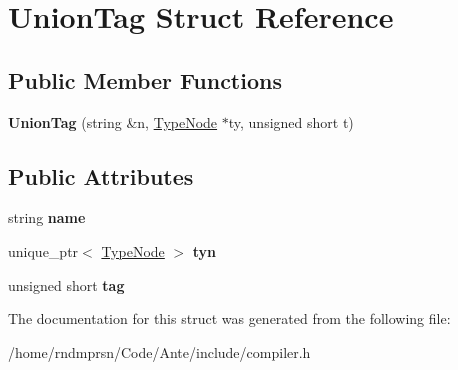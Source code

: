 \hypertarget{structUnionTag}{}\section{Union\+Tag Struct Reference}
\label{structUnionTag}
\subsection*{Public Member Functions}
\begin{DoxyCompactItemize}
\item 
\mbox{\label{structUnionTag_aa739cecbbf668141b88c4ff8b6cfbc5b}} 
{\bfseries Union\+Tag} (string \&n, \hyperlink{structTypeNode}{Type\+Node} $\ast$ty, unsigned short t)
\end{DoxyCompactItemize}
\subsection*{Public Attributes}
\begin{DoxyCompactItemize}
\item 
\mbox{\label{structUnionTag_ab73e6ebdee667537a693b22cf6a848b1}} 
string {\bfseries name}
\item 
\mbox{\label{structUnionTag_a020bb39f5d96eedecf5672efcefe8326}} 
unique\+\_\+ptr$<$ \hyperlink{structTypeNode}{Type\+Node} $>$ {\bfseries tyn}
\item 
\mbox{\label{structUnionTag_a681198408c54d2a565a5d3c4721d0280}} 
unsigned short {\bfseries tag}
\end{DoxyCompactItemize}


The documentation for this struct was generated from the following file\+:\begin{DoxyCompactItemize}
\item 
/home/rndmprsn/\+Code/\+Ante/include/compiler.\+h\end{DoxyCompactItemize}
